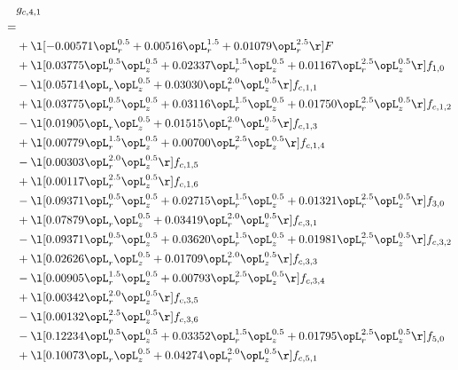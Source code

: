 \begin{alignat}{2} 
\label{eq:g_41_0} 
& g_{c,4,1} \nonumber \\ 
 = \\ 
& + \l[  -0.00571 \opL_r^{0.5} +  0.00516 \opL_r^{1.5} +  0.01079 \opL_r^{2.5}  \r] F \nonumber \\ 
& + \l[  0.03775 \opL_r^{0.5} \opL_z^{0.5} +  0.02337 \opL_r^{1.5} \opL_z^{0.5} +  0.01167 \opL_r^{2.5} \opL_z^{0.5}  \r] f_{1,0} \nonumber \\ 
& - \l[  0.05714 \opL_r \opL_z^{0.5} +  0.03030 \opL_r^{2.0} \opL_z^{0.5}  \r] f_{c,1,1} \nonumber \\ 
& + \l[  0.03775 \opL_r^{0.5} \opL_z^{0.5} +  0.03116 \opL_r^{1.5} \opL_z^{0.5} +  0.01750 \opL_r^{2.5} \opL_z^{0.5}  \r] f_{c,1,2} \nonumber \\ 
& - \l[  0.01905 \opL_r \opL_z^{0.5} +  0.01515 \opL_r^{2.0} \opL_z^{0.5}  \r] f_{c,1,3} \nonumber \\ 
& + \l[  0.00779 \opL_r^{1.5} \opL_z^{0.5} +  0.00700 \opL_r^{2.5} \opL_z^{0.5}  \r] f_{c,1,4} \nonumber \\ 
& - \l[  0.00303 \opL_r^{2.0} \opL_z^{0.5}  \r] f_{c,1,5} \nonumber \\ 
& + \l[  0.00117 \opL_r^{2.5} \opL_z^{0.5}  \r] f_{c,1,6} \nonumber \\ 
& - \l[  0.09371 \opL_r^{0.5} \opL_z^{0.5} +  0.02715 \opL_r^{1.5} \opL_z^{0.5} +  0.01321 \opL_r^{2.5} \opL_z^{0.5}  \r] f_{3,0} \nonumber \\ 
& + \l[  0.07879 \opL_r \opL_z^{0.5} +  0.03419 \opL_r^{2.0} \opL_z^{0.5}  \r] f_{c,3,1} \nonumber \\ 
& - \l[  0.09371 \opL_r^{0.5} \opL_z^{0.5} +  0.03620 \opL_r^{1.5} \opL_z^{0.5} +  0.01981 \opL_r^{2.5} \opL_z^{0.5}  \r] f_{c,3,2} \nonumber \\ 
& + \l[  0.02626 \opL_r \opL_z^{0.5} +  0.01709 \opL_r^{2.0} \opL_z^{0.5}  \r] f_{c,3,3} \nonumber \\ 
& - \l[  0.00905 \opL_r^{1.5} \opL_z^{0.5} +  0.00793 \opL_r^{2.5} \opL_z^{0.5}  \r] f_{c,3,4} \nonumber \\ 
& + \l[  0.00342 \opL_r^{2.0} \opL_z^{0.5}  \r] f_{c,3,5} \nonumber \\ 
& - \l[  0.00132 \opL_r^{2.5} \opL_z^{0.5}  \r] f_{c,3,6} \nonumber \\ 
& - \l[  0.12234 \opL_r^{0.5} \opL_z^{0.5} +  0.03352 \opL_r^{1.5} \opL_z^{0.5} +  0.01795 \opL_r^{2.5} \opL_z^{0.5}  \r] f_{5,0} \nonumber \\ 
& + \l[  0.10073 \opL_r \opL_z^{0.5} +  0.04274 \opL_r^{2.0} \opL_z^{0.5}  \r] f_{c,5,1} \nonumber \\ 

\end{alignat}
